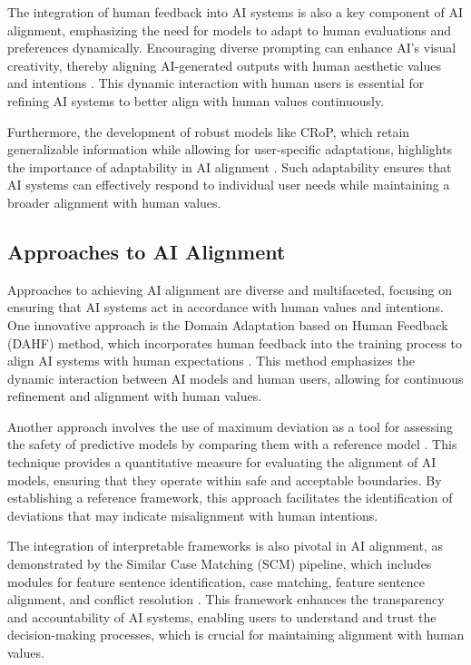 The integration of human feedback into AI systems is also a key component of AI alignment, emphasizing the need for models to adapt to human evaluations and preferences dynamically. Encouraging diverse prompting can enhance AI's visual creativity, thereby aligning AI-generated outputs with human aesthetic values and intentions \cite{palmini2024patternscreativityuserinput}. This dynamic interaction with human users is essential for refining AI systems to better align with human values continuously.

Furthermore, the development of robust models like CRoP, which retain generalizable information while allowing for user-specific adaptations, highlights the importance of adaptability in AI alignment \cite{kaur2024cropcontextwiserobuststatic}. Such adaptability ensures that AI systems can effectively respond to individual user needs while maintaining a broader alignment with human values.



\subsection{Approaches to AI Alignment} \label{subsec:Approaches to AI Alignment}

Approaches to achieving AI alignment are diverse and multifaceted, focusing on ensuring that AI systems act in accordance with human values and intentions. One innovative approach is the Domain Adaptation based on Human Feedback (DAHF) method, which incorporates human feedback into the training process to align AI systems with human expectations \cite{park2023domainadaptationbasedhuman}. This method emphasizes the dynamic interaction between AI models and human users, allowing for continuous refinement and alignment with human values.



Another approach involves the use of maximum deviation as a tool for assessing the safety of predictive models by comparing them with a reference model \cite{wei2022safetyinterpretablemachinelearning}. This technique provides a quantitative measure for evaluating the alignment of AI models, ensuring that they operate within safe and acceptable boundaries. By establishing a reference framework, this approach facilitates the identification of deviations that may indicate misalignment with human intentions.



The integration of interpretable frameworks is also pivotal in AI alignment, as demonstrated by the Similar Case Matching (SCM) pipeline, which includes modules for feature sentence identification, case matching, feature sentence alignment, and conflict resolution \cite{lin2023interpretabilityframeworksimilarcase}. This framework enhances the transparency and accountability of AI systems, enabling users to understand and trust the decision-making processes, which is crucial for maintaining alignment with human values.



